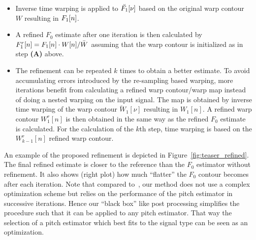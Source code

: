\begin{itemize}
    \item Inverse time warping is applied to $\breve{{F}_1}[\nu]$ based on the original warp contour $W$ resulting in ${F}_1[n]$.
    \item A refined $F_0$ estimate after one iteration is then calculated by ${F}_1^r[n] = {F}_1[n] \cdot W[n] / \bar{W}$ assuming that the warp contour is initialized as in step \textbf{(A)} above.
    \item The refinement can be repeated $k$ times to obtain a better estimate. To avoid accumulating errors introduced by the re-sampling based warping, more iterations benefit from calculating a refined warp contour/warp map instead of doing a nested warping on the input signal. The map is obtained by inverse time warping of the warp contour $\breve{W}_1[\nu]$ resulting in $W_1[n]$. A refined warp contour $W_1^r[n]$ is then obtained in the same way as the refined $F_0$ estimate is calculated. For the calculation of the $k$th step, time warping is based on the $W_{k-1}^r[n]$ refined warp contour.
\end{itemize}
An example of the proposed refinement is depicted in Figure~\ref{fig:teaser_refined}. The final refined estimate is closer to the reference than the $F_0$ estimator without refinement. It also shows (right plot) how much ``flatter'' the $F_0$ contour becomes after each iteration.
Note that compared to~\cite{resch07}, our method does not use a complex optimization scheme but relies on the performance of the pitch estimator in successive iterations. Hence our ``black box'' like post processing simplifies the procedure such that it can be applied to any pitch estimator. That way the selection of a pitch estimator which best fits to the signal type can be seen as an optimization.

